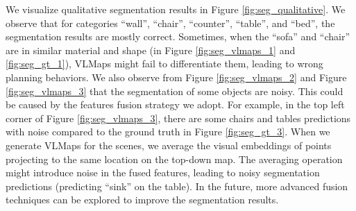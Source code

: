 \documentclass[letterpaper, 10 pt, conference]{ieeeconf}  %
\begin{document}
We visualize qualitative segmentation results in Figure \ref{fig:seg_qualitative}. We observe that for categories ``wall'', ``chair'', ``counter'', ``table'', and ``bed'', the segmentation results are mostly correct. Sometimes, when the ``sofa'' and ``chair'' are in similar material and shape (in Figure \ref{fig:seg_vlmaps_1} and \ref{fig:seg_gt_1}), VLMaps might fail to differentiate them, leading to wrong planning behaviors. We also observe from Figure \ref{fig:seg_vlmaps_2} and Figure \ref{fig:seg_vlmaps_3} that the segmentation of some objects are noisy. This could be caused by the features fusion strategy we adopt. For example, in the top left corner of Figure \ref{fig:seg_vlmaps_3}, there are some chairs and tables predictions with noise compared to the ground truth in Figure \ref{fig:seg_gt_3}. When we generate VLMaps for the scenes, we average the visual embeddings of points projecting to the same location on the top-down map. The averaging operation might introduce noise in the fused features, leading to noisy segmentation predictions (predicting ``sink'' on the table). In the future, more advanced fusion techniques can be explored to improve the segmentation results.
\end{document}

